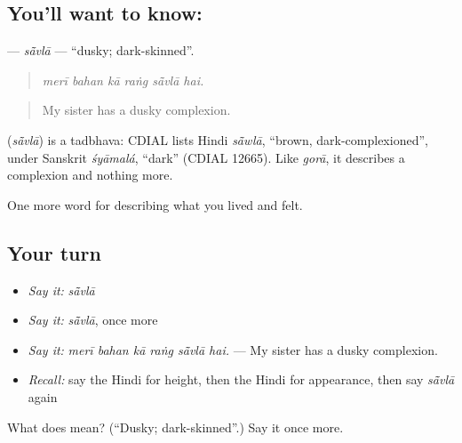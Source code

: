 \subsection*{You'll want to know: }
\textbf{} — \emph{sā̃vlā} — \textquotedblleft{}dusky; dark-skinned\textquotedblright{}.

\begin{quote}
     
\end{quote}

\begin{quote}
\emph{merī bahan kā raṅg sā̃vlā hai.}
\end{quote}

\begin{quote}
My sister has a dusky complexion.
\end{quote}

\begin{cousinweb}
\textbf{} (\emph{sā̃vlā}) is a tadbhava: CDIAL lists Hindi \emph{sā̃wlā}, \textquotedblleft{}brown, dark-complexioned\textquotedblright{}, under Sanskrit \emph{śyāmalá}, \textquotedblleft{}dark\textquotedblright{} (CDIAL 12665). Like \emph{gorā}, it describes a complexion and nothing more.
\end{cousinweb}

\begin{grammarlens}[title={What you've built}]
One more word for describing what you lived and felt.
\end{grammarlens}

\subsection*{Your turn}
\begin{itemize}
\raggedright
  \item \emph{Say it:} \emph{sā̃vlā}
  \item \emph{Say it:} \emph{sā̃vlā}, once more
  \item \emph{Say it:} \emph{merī bahan kā raṅg sā̃vlā hai.} — My sister has a dusky complexion.
  \item \emph{Recall:} say the Hindi for height, then the Hindi for appearance, then say \emph{sā̃vlā} again
\end{itemize}

\begin{tcolorbox}[breakable,colback=teal!4,colframe=teal!35!black,title={Before you move on}]
What does  mean? (\textquotedblleft{}Dusky; dark-skinned\textquotedblright{}.) Say it once more.
\end{tcolorbox}
